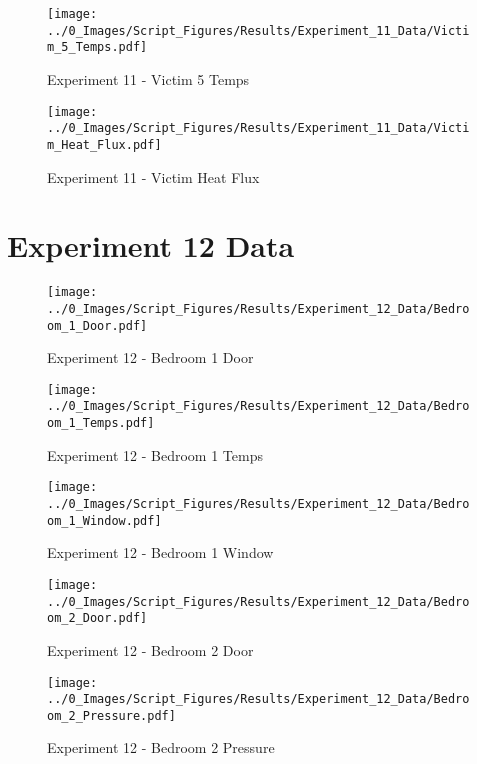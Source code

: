 	\begin{figure}[H]
		\centering
		\texttt{[image: ../0\_Images/Script\_Figures/Results/Experiment\_11\_Data/Victim\_5\_Temps.pdf]}
		\caption[]{Experiment 11 - Victim 5 Temps}
	\end{figure}
 
	\clearpage

	\begin{figure}[H]
		\centering
		\texttt{[image: ../0\_Images/Script\_Figures/Results/Experiment\_11\_Data/Victim\_Heat\_Flux.pdf]}
		\caption[]{Experiment 11 - Victim Heat Flux}
	\end{figure}
 

\clearpage		\large
\section{Experiment 12 Data} \label{App:Exp12Results} 

	\begin{figure}[H]
		\centering
		\texttt{[image: ../0\_Images/Script\_Figures/Results/Experiment\_12\_Data/Bedroom\_1\_Door.pdf]}
		\caption[]{Experiment 12 - Bedroom 1 Door}
	\end{figure}
 

	\begin{figure}[H]
		\centering
		\texttt{[image: ../0\_Images/Script\_Figures/Results/Experiment\_12\_Data/Bedroom\_1\_Temps.pdf]}
		\caption[]{Experiment 12 - Bedroom 1 Temps}
	\end{figure}
 
	\clearpage

	\begin{figure}[H]
		\centering
		\texttt{[image: ../0\_Images/Script\_Figures/Results/Experiment\_12\_Data/Bedroom\_1\_Window.pdf]}
		\caption[]{Experiment 12 - Bedroom 1 Window}
	\end{figure}
 

	\begin{figure}[H]
		\centering
		\texttt{[image: ../0\_Images/Script\_Figures/Results/Experiment\_12\_Data/Bedroom\_2\_Door.pdf]}
		\caption[]{Experiment 12 - Bedroom 2 Door}
	\end{figure}
 
	\clearpage

	\begin{figure}[H]
		\centering
		\texttt{[image: ../0\_Images/Script\_Figures/Results/Experiment\_12\_Data/Bedroom\_2\_Pressure.pdf]}
		\caption[]{Experiment 12 - Bedroom 2 Pressure}
	\end{figure}
 

